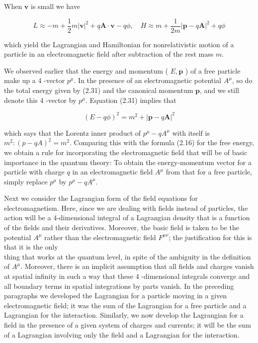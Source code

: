 \documentclass[10pt, letterpaper]{article}
\begin{document}
When $\mathbf{v}$ is small we have

$$
L \approx-m+\frac{1}{2} m|\mathbf{v}|^{2}+q \mathbf{A} \cdot \mathbf{v}-q \phi, \quad H \approx m+\frac{1}{2 m}|\mathbf{p}-q \mathbf{A}|^{2}+q \phi
$$

which yield the Lagrangian and Hamiltonian for nonrelativistic motion of a particle in an electromagnetic field after subtraction of the rest mass $m$.

We observed earlier that the energy and momentum ( $E, \mathbf{p}$ ) of a free particle make up a 4 -vector $p^{\mu}$. In the presence of an electromagnetic potential $A^{\mu}$, so do the total energy given by (2.31) and the canonical momentum $\mathbf{p}$, and we still denote this 4 -vector by $p^{\mu}$. Equation (2.31) implies that

$$
(E-q \phi)^{2}=m^{2}+|\mathbf{p}-q \mathbf{A}|^{2}
$$

which says that the Lorentz inner product of $p^{\mu}-q A^{\mu}$ with itself is $m^{2}:(p-q A)^{2}= m^{2}$. Comparing this with the formula (2.16) for the free energy, we obtain a rule for incorporating the electromagnetic field that will be of basic importance in the quantum theory: To obtain the energy-momentum vector for a particle with charge $q$ in an electromagnetic field $A^{\mu}$ from that for a free particle, simply replace $p^{\mu}$ by $p^{\mu}-q A^{\mu}$.

Next we consider the Lagrangian form of the field equations for electromagnetism. Here, since we are dealing with fields instead of particles, the action will be a 4-dimensional integral of a Lagrangian density that is a function of the fields and their derivatives. Moreover, the basic field is taken to be the potential $A^{\mu}$ rather than the electromagnetic field $F^{\mu \nu}$; the justification for this is that it is the only\\
thing that works at the quantum level, in spite of the ambiguity in the definition of $A^{\mu}$. Moreover, there is an implicit assumption that all fields and charges vanish at spatial infinity in such a way that these 4 -dimensional integrals converge and all boundary terms in spatial integrations by parts vanish. In the preceding paragraphs we developed the Lagrangian for a particle moving in a given electromagnetic field; it was the sum of the Lagrangian for a free particle and a Lagrangian for the interaction. Similarly, we now develop the Lagrangian for a field in the presence of a given system of charges and currents; it will be the sum of a Lagrangian involving only the field and a Lagrangian for the interaction.
\end{document}

